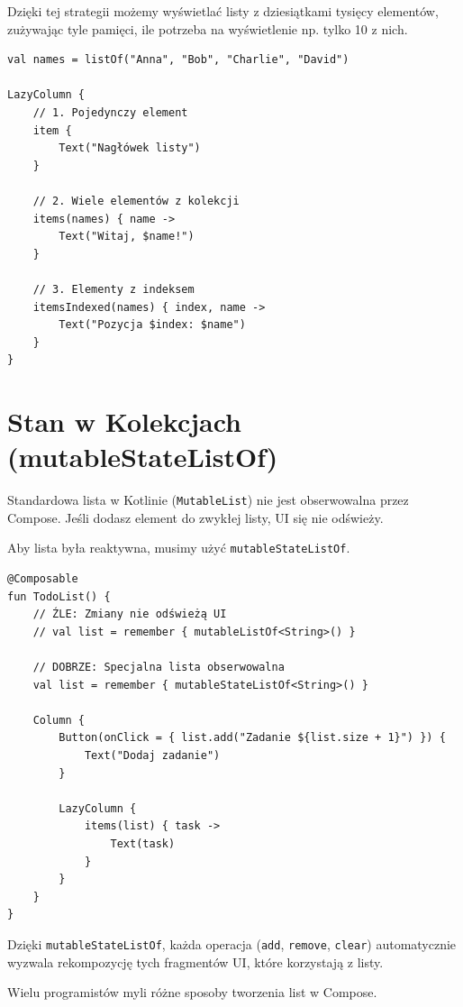 Dzięki tej strategii możemy wyświetlać listy z dziesiątkami tysięcy elementów, zużywając tyle pamięci, ile potrzeba na wyświetlenie np. tylko 10 z nich.

\begin{verbatim}
val names = listOf("Anna", "Bob", "Charlie", "David")

LazyColumn {
    // 1. Pojedynczy element
    item {
        Text("Nagłówek listy")
    }

    // 2. Wiele elementów z kolekcji
    items(names) { name ->
        Text("Witaj, $name!")
    }

    // 3. Elementy z indeksem
    itemsIndexed(names) { index, name ->
        Text("Pozycja $index: $name")
    }
}
\end{verbatim}

\section{Stan w Kolekcjach (mutableStateListOf)}

Standardowa lista w Kotlinie (\texttt{MutableList}) nie jest obserwowalna przez Compose. Jeśli dodasz element do zwykłej listy, UI się nie odświeży.

Aby lista była reaktywna, musimy użyć \texttt{mutableStateListOf}.

\begin{verbatim}
@Composable
fun TodoList() {
    // ŹLE: Zmiany nie odświeżą UI
    // val list = remember { mutableListOf<String>() }

    // DOBRZE: Specjalna lista obserwowalna
    val list = remember { mutableStateListOf<String>() }

    Column {
        Button(onClick = { list.add("Zadanie ${list.size + 1}") }) {
            Text("Dodaj zadanie")
        }
        
        LazyColumn {
            items(list) { task ->
                Text(task)
            }
        }
    }
}
\end{verbatim}

Dzięki \texttt{mutableStateListOf}, każda operacja (\texttt{add}, \texttt{remove}, \texttt{clear}) automatycznie wyzwala rekompozycję tych fragmentów UI, które korzystają z listy.

Wielu programistów myli różne sposoby tworzenia list w Compose.

